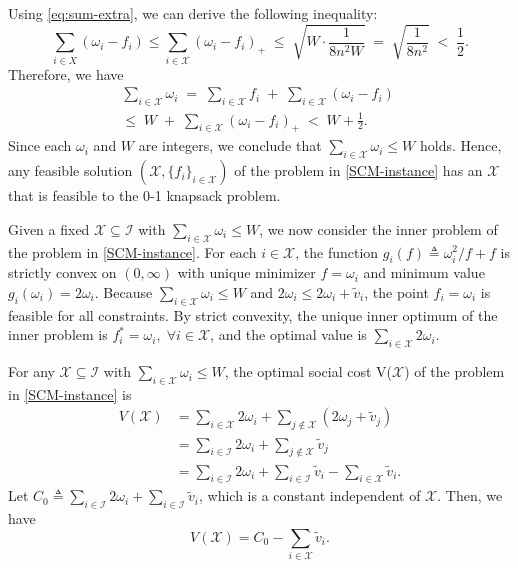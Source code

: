 \documentclass[lettersize,journal]{IEEEtran}
\begin{document}
Using \eqref{eq:sum-extra}, we can derive the following inequality:
\begin{equation}
    \sum_{i\in X}(\omega_i-f_i)\le\sum_{i\in \mathcal{X}}(\omega_i-f_i)_+
\;\le\;
\sqrt{W\cdot \frac{1}{8n^2W}}
\;=\;
\sqrt{\frac{1}{8n^2}}
\;<\;\frac{1}{2}.
\end{equation}
Therefore, we have
\begin{align}
    \sum_{i\in \mathcal{X}}\omega_i
\;=\;
\sum_{i\in \mathcal{X}} f_i\;+\;\sum_{i\in \mathcal{X}}(\omega_i-f_i)
\;\nonumber\\\le\;
W\;+\;\sum_{i\in \mathcal{X}}(\omega_i-f_i)_+
\;<\;
W+\tfrac{1}{2}.
\end{align}
Since each $\omega_i$ and $W$ are integers, we conclude that $\sum_{i\in \mathcal{X}}\omega_i\le W$ holds. Hence, any feasible solution $(\mathcal{X},\{f_i\}_{i\in\mathcal{X}})$ of the problem in \eqref{SCM-instance} has an $\mathcal{X}$ that is feasible to the 0-1 knapsack problem.
    
Given a fixed $\mathcal{X}\subseteq \mathcal{I}$ with $\sum_{i\in \mathcal{X}}\omega_i\le W$, we now consider the inner problem of the problem in \eqref{SCM-instance}.
For each $i\in\mathcal{X}$, the function $g_i(f)\triangleq\omega_i^2/f+f$ is strictly convex on $(0,\infty)$ with unique minimizer $f=\omega_i$ and minimum value $g_i(\omega_i)=2\omega_i$. Because $\sum_{i\in \mathcal{X}}\omega_i\le W$ and $2\omega_i\le 2\omega_i+\tilde v_i$, the point $f_i=\omega_i$ is feasible for all constraints. By strict convexity, the unique inner optimum of the inner problem is $f_i^*=\omega_i,\;\forall i\in \mathcal{X}$, and the optimal value is $\sum_{i\in \mathcal{X}}2\omega_i$.

For any $\mathcal{X}\subseteq \mathcal{I}$ with $\sum_{i\in \mathcal{X}}\omega_i\le W$, the optimal social cost V($\mathcal{X}$) of the problem in \eqref{SCM-instance} is
\begin{align}
V(\mathcal{X})
&=\sum_{i\in \mathcal{X}}2\omega_i+\sum_{j\notin \mathcal{X}}(2\omega_j+\tilde v_j)\nonumber\\
&=\sum_{i\in \mathcal{I}}2\omega_i
+\sum_{j\notin \mathcal{X}}\tilde v_j\nonumber\\
&=\sum_{i\in \mathcal{I}}2\omega_i+\sum_{i\in \mathcal{I}}\tilde v_i-\sum_{i\in \mathcal{X}}\tilde v_i.
\end{align}
Let $C_0\triangleq\sum_{i\in \mathcal{I}}2\omega_i+\sum_{i\in\mathcal{I}}\tilde v_i$, which is a constant independent of $\mathcal{X}$. Then, we have
\begin{equation}
    V(\mathcal{X})=C_0-\sum_{i\in \mathcal{X}}\tilde v_i.
\end{equation}
\end{document}
